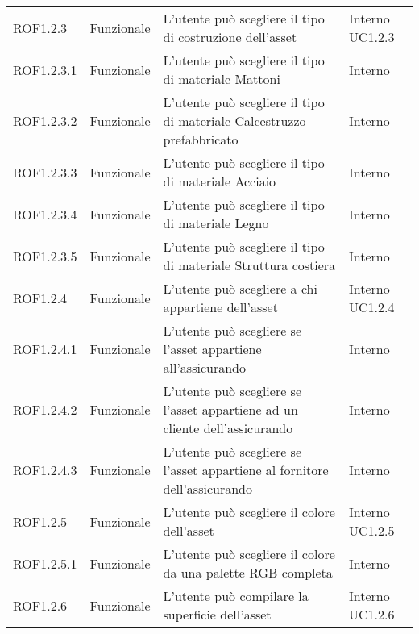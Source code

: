 \begin{longtable}{p{2cm}!{\VRule[1pt]}p{2cm}!{\VRule[1pt]}p{5cm}!{\VRule[1pt]}p{1.5cm}}
 \\
ROF1.2.3&Funzionale\newline  & L'utente può scegliere il tipo di costruzione dell'asset & Interno \newline UC1.2.3
 \\
ROF1.2.3.1&Funzionale\newline  & L'utente può scegliere il tipo di materiale Mattoni & Interno \\
ROF1.2.3.2&Funzionale\newline  & L'utente può scegliere il tipo di materiale Calcestruzzo prefabbricato & Interno \\
ROF1.2.3.3&Funzionale\newline  & L'utente può scegliere il tipo di materiale Acciaio & Interno \\
ROF1.2.3.4&Funzionale\newline  & L'utente può scegliere il tipo di materiale Legno & Interno \\
ROF1.2.3.5&Funzionale\newline  & L'utente può scegliere il tipo di materiale Struttura costiera & Interno \\
ROF1.2.4&Funzionale\newline  & L'utente può scegliere a chi appartiene dell'asset & Interno \newline UC1.2.4
 \\
ROF1.2.4.1&Funzionale\newline  & L'utente può scegliere se l'asset appartiene all'assicurando & Interno \\
ROF1.2.4.2&Funzionale\newline  & L'utente può scegliere se l'asset appartiene ad un cliente dell'assicurando & Interno \\
ROF1.2.4.3&Funzionale\newline  & L'utente può scegliere se l'asset appartiene al fornitore dell'assicurando & Interno \\
ROF1.2.5&Funzionale\newline  & L'utente può scegliere il colore dell'asset & Interno \newline UC1.2.5
 \\
ROF1.2.5.1&Funzionale\newline  & L'utente può scegliere il colore da una palette RGB completa & Interno \\
ROF1.2.6&Funzionale\newline  & L'utente può compilare la superficie dell'asset & Interno \newline UC1.2.6

\end{longtable}

